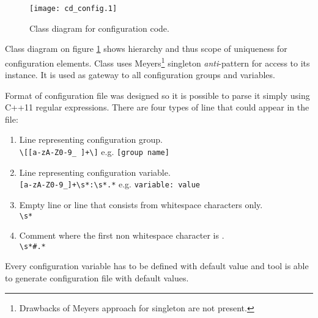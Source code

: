 \begin{figure}[h!]
	\label{cdconfiguration}
	\caption{Class diagram for configuration code.}
	\centering
		\texttt{[image: cd\_config.1]}
\end{figure}

Class diagram on figure \ref{cdconfiguration} shows hierarchy and thus scope of uniqueness for configuration elements. Class  uses Meyers\footnote{Drawbacks of Meyers approach for singleton are not present.} singleton \emph{anti}-pattern for access to its instance. It is used as gateway to all configuration groups and variables.

Format of configuration file was designed so it is possible to parse it simply using C++11 regular expressions. There are four types of line that could appear in the file:

\begin{enumerate}
\item{Line representing configuration group.\\ \verb$\[[a-zA-Z0-9_ ]+\]$ e.g. \verb$[group name]$}  
\item{Line representing configuration variable. \\ \verb$[a-zA-Z0-9_]+\s*:\s*.*$ e.g. \verb$variable: value$}
\item{Empty line or line that consists from whitespace characters only. \\ \verb$\s*$}
\item{Comment where the first non whitespace character is \code{\#}. \\ \verb$\s*#.*$}
\end{enumerate}

Every configuration variable has to be defined with default value and tool is able to generate configuration file with default values.